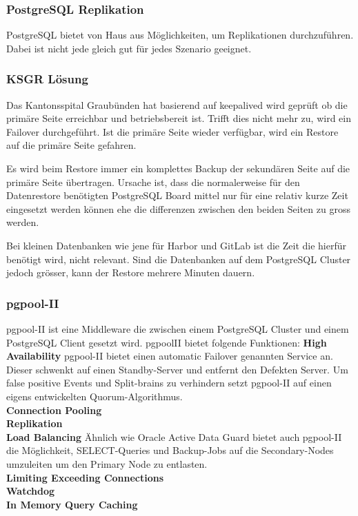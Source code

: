 \subsubsection{\Gls{PostgreSQL} Replikation}
PostgreSQL bietet von Haus aus Möglichkeiten, um Replikationen durchzuführen.
Dabei ist nicht jede gleich gut für jedes Szenario geeignet\cite{FZAHA89U}.

\subsubsection{KSGR Lösung}
Das Kantonsspital Graubünden hat basierend auf \gls{keepalived} wird geprüft ob die primäre Seite erreichbar und betriebsbereit ist.
Trifft dies nicht mehr zu, wird ein \Gls{Failover} durchgeführt\cite{NLF2IDBZ}.
Ist die primäre Seite wieder verfügbar, wird ein Restore auf die primäre Seite gefahren.

Es wird beim Restore immer ein komplettes Backup der sekundären Seite auf die primäre Seite übertragen.
Ursache ist, dass die normalerweise für den Datenrestore benötigten \Gls{PostgreSQL} Board mittel nur für eine relativ kurze Zeit eingesetzt werden können ehe die differenzen zwischen den beiden Seiten zu gross werden.

Bei kleinen Datenbanken wie jene für \Gls{Harbor} und \Gls{GitLab} ist die Zeit die hierfür benötigt wird, nicht relevant.
Sind die Datenbanken auf dem \Gls{PostgreSQL Cluster} jedoch grösser, kann der Restore mehrere Minuten dauern.
\subsubsection{pgpool-II}
pgpool-II ist eine Middleware die zwischen einem \Gls{PostgreSQL Cluster} und einem PostgreSQL Client gesetzt wird.
pgpoolII bietet folgende Funktionen\cite{EXVNLICT,3XWCD3KX}:
\textbf{High Availability}
pgpool-II bietet einen automatic \Gls{Failover} genannten Service an.
Dieser schwenkt auf einen Standby-Server und entfernt den Defekten Server.
Um false positive Events und Split-brains zu verhindern setzt pgpool-II auf einen eigens entwickelten \Gls{Quorum}-Algorithmus.
\\\textbf{Connection Pooling}
\\\textbf{Replikation}
\\\textbf{Load Balancing}
Ähnlich wie Oracle Active Data Guard \cite{6294443C} bietet auch pgpool-II die Möglichkeit, SELECT-Queries und Backup-Jobs auf die Secondary-Nodes umzuleiten um den Primary Node zu entlasten.
\\\textbf{Limiting Exceeding Connections}
\\\textbf{Watchdog}
\\\textbf{In Memory Query Caching}


